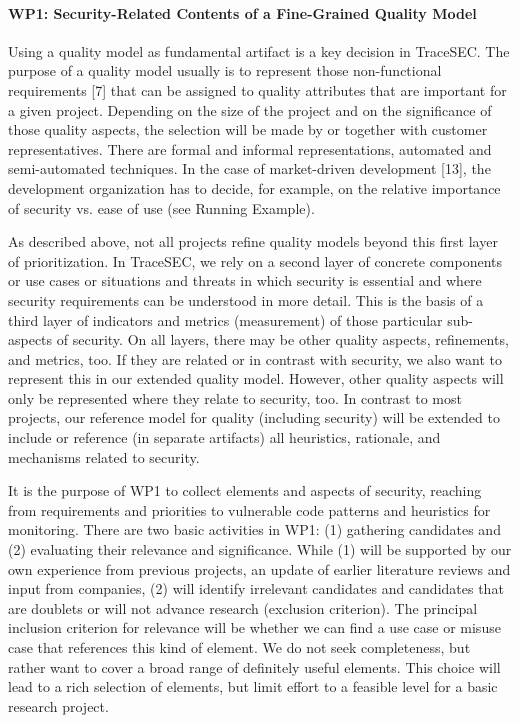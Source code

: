 \paragraph*{WP1: Security-Related Contents of a Fine-Grained Quality Model}
Using a quality model as fundamental artifact is a key decision in TraceSEC. The purpose of a quality model usually is to represent those non-functional requirements [7] that can be assigned to quality attributes that are important for a given project. Depending on the size of the project and on the significance of those quality aspects, the selection will be made by or together with customer representatives. There are formal and informal representations, automated and semi-automated techniques. In the case of market-driven development [13], the development organization has to decide, for example, on the relative importance of security vs. ease of use (see Running Example). 

As described above, not all projects refine quality models beyond this first layer of prioritization. In TraceSEC, we rely on a second layer of concrete components or use cases or situations and threats in which security is essential and where security requirements can be understood in more detail. This is the basis of a third layer of indicators and metrics (measurement) of those particular sub-aspects of security. On all layers, there may be other quality aspects, refinements, and metrics, too. If they are related or in contrast with security, we also want to represent this in our extended quality model. However, other quality aspects will only be represented where they relate to security, too. In contrast to most projects, our reference model for quality (including security) will be extended to include or reference (in separate artifacts) all heuristics, rationale, and mechanisms related to security. 

It is the purpose of WP1 to collect elements and aspects of security, reaching from requirements and priorities to vulnerable code patterns and heuristics for monitoring. There are two basic activities in WP1: (1) gathering candidates and (2) evaluating their relevance and significance. While (1) will be supported by our own experience from previous projects, an update of earlier literature reviews  and input from companies, (2) will identify irrelevant candidates and candidates that are doublets or will not advance research (exclusion criterion). The principal inclusion criterion for relevance will be whether we can find a use case or misuse case that references this kind of element. We do not seek completeness, but rather want to cover a broad range of definitely useful elements. This choice will lead to a rich selection of elements, but limit effort to a feasible level for a basic research project. 

